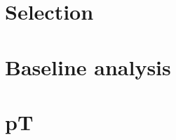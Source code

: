 \documentclass[9pt,xcolor={table,svgnames},aspectratio=43]{beamer}
\begin{document}






\section{Selection}


\section{Baseline analysis}


\section{pT}

%
\end{document}
